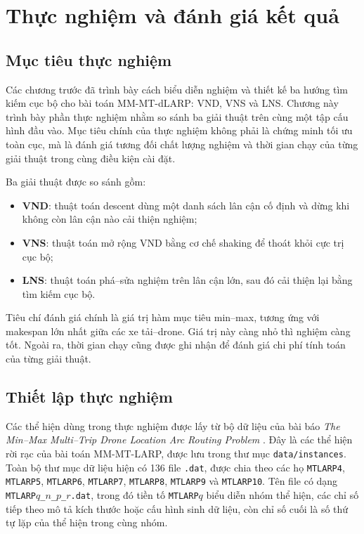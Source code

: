 \chapter{Thực nghiệm và đánh giá kết quả}
\label{chap:thuc-nghiem}

\section{Mục tiêu thực nghiệm}
\label{sec:experiment-objective}

Các chương trước đã trình bày cách biểu diễn nghiệm và thiết kế ba hướng tìm kiếm cục bộ cho bài toán MM-MT-dLARP: VND, VNS và LNS. Chương này trình bày phần thực nghiệm nhằm so sánh ba giải thuật trên cùng một tập cấu hình đầu vào. Mục tiêu chính của thực nghiệm không phải là chứng minh tối ưu toàn cục, mà là đánh giá tương đối chất lượng nghiệm và thời gian chạy của từng giải thuật trong cùng điều kiện cài đặt.

Ba giải thuật được so sánh gồm:
\begin{itemize}
    \item \textbf{VND}: thuật toán descent dùng một danh sách lân cận cố định và dừng khi không còn lân cận nào cải thiện nghiệm;
    \item \textbf{VNS}: thuật toán mở rộng VND bằng cơ chế shaking để thoát khỏi cực trị cục bộ;
    \item \textbf{LNS}: thuật toán phá--sửa nghiệm trên lân cận lớn, sau đó cải thiện lại bằng tìm kiếm cục bộ.
\end{itemize}

Tiêu chí đánh giá chính là giá trị hàm mục tiêu min--max, tương ứng với makespan lớn nhất giữa các xe tải--drone. Giá trị này càng nhỏ thì nghiệm càng tốt. Ngoài ra, thời gian chạy cũng được ghi nhận để đánh giá chi phí tính toán của từng giải thuật.

\section{Thiết lập thực nghiệm}
\label{sec:experiment-setup}

Các thể hiện dùng trong thực nghiệm được lấy từ bộ dữ liệu của bài báo \textit{The Min--Max Multi--Trip Drone Location Arc Routing Problem} \cite{corberan2025mmdlarp}. Đây là các thể hiện rời rạc của bài toán MM-MT-LARP, được lưu trong thư mục \texttt{data/instances}. Toàn bộ thư mục dữ liệu hiện có 136 file \texttt{.dat}, được chia theo các họ \texttt{MTLARP4}, \texttt{MTLARP5}, \texttt{MTLARP6}, \texttt{MTLARP7}, \texttt{MTLARP8}, \texttt{MTLARP9} và \texttt{MTLARP10}. Tên file có dạng \texttt{MTLARP\(q\)\_\(n\)\_\(p\)\_\(r\).dat}, trong đó tiền tố \texttt{MTLARP\(q\)} biểu diễn nhóm thể hiện, các chỉ số tiếp theo mô tả kích thước hoặc cấu hình sinh dữ liệu, còn chỉ số cuối là số thứ tự lặp của thể hiện trong cùng nhóm.

